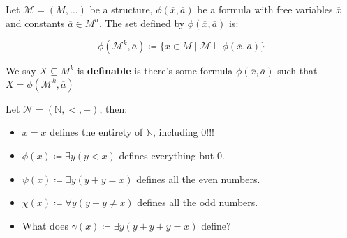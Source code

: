 \documentclass{beamer}
\begin{document}
\begin{frame}
    \begin{definition}
        Let $\mathcal{M} = (M, \ldots)$ be a structure, $\phi(\overline{x}, \overline{a})$ be a formula with free variables $\overline{x}$ and constants $\overline{a} \in M^n$. The set defined by $\phi(\overline{x}, \overline{a})$ is:
        
        $$ \phi(\mathcal{M}^k, \overline{a}) \coloneqq \{x \in M \mid \mathcal{M} \models \phi(\overline{x}, \overline{a}) \}$$
        
        We say $X \subseteq M^k$ is \textbf{definable} is there's some formula $\phi(\overline{x}, \overline{a})$ such that $X = \phi(\mathcal{M}^k, \overline{a})$
    \end{definition}
    
    \begin{example}
         Let $\mathcal{N} = (\mathbb{N}, <, +)$, then:
         
         \begin{itemize}
             \item $x = x$ defines the entirety of $\mathbb{N}$, including $0$!!!
             \item $\phi(x) \coloneqq \exists y (y < x)$ defines everything but $0$.
             \item $\psi(x) \coloneqq \exists y (y + y = x)$ defines all the even numbers.
             \item $\chi(x) \coloneqq \forall y (y + y \not = x)$ defines all the odd numbers.
             \item What does $\gamma (x) \coloneqq \exists y(y + y + y =x)$ define?
         \end{itemize}
    \end{example}
\end{frame}
    
\end{document}
